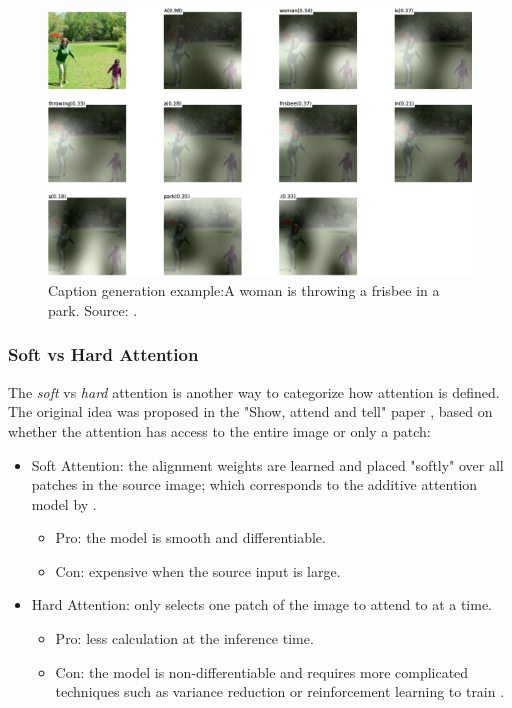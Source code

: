\begin{figure}[hpt]
    \centering
    \includegraphics[scale=0.2]{images/ch3/visual-attention.jpg}
    \caption{Caption generation example:A woman is throwing a frisbee in a park. Source: \citep{Xu2015}.}
    \label{fig:visual-attention}
\end{figure}

\subsubsection{Soft vs Hard Attention}

The \textit{soft} vs \textit{hard} attention is another way to categorize how attention is defined. The original idea was proposed in the "Show, attend and tell" paper \citep{Xu2015}, based on whether the attention has access to the entire image or only a patch:

\begin{itemize}
    \item Soft Attention: the alignment weights are learned and placed "softly" over all patches in the source image; which corresponds to the additive attention model by \citet{Bahdanau2015}.
    \begin{itemize}
        \item Pro: the model is smooth and differentiable.
        \item Con: expensive when the source input is large.
    \end{itemize}
    \item Hard Attention: only selects one patch of the image to attend to at a time.
    \begin{itemize}
        \item Pro: less calculation at the inference time.
        \item Con: the model is non-differentiable and requires more complicated techniques such as variance reduction or reinforcement learning to train \citep{Luong2015}. 
    \end{itemize}
\end{itemize}


